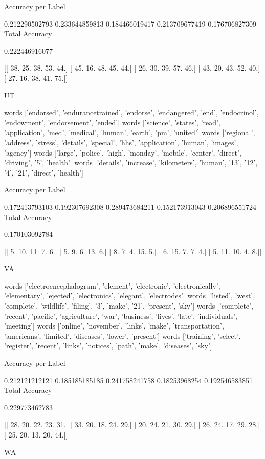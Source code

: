 \documentclass[11pt]{article}
\begin{document}
\begin{verbatium}
Accuracy per Label

0.212290502793
0.233644859813
0.184466019417
0.213709677419
0.176706827309
Total Accuracy

0.222446916077


[[ 38.  25.  38.  53.  44.]
 [ 45.  16.  48.  45.  44.]
 [ 26.  30.  39.  57.  46.]
 [ 43.  20.  43.  52.  40.]
 [ 27.  16.  38.  41.  75.]]


UT


words
['endorsed', 'endurancetrained', 'endorse', 'endangered', 'end', 'endocrinol', 'endowment', 'endorsement', 'ended']
words
['science', 'states', 'read', 'application', 'med', 'medical', 'human', 'earth', 'pm', 'united']
words
['regional', 'address', 'stress', 'details', 'special', 'hhs', 'application', 'human', 'images', 'agency']
words
['large', 'police', 'high', 'monday', 'mobile', 'center', 'direct', 'driving', '5', 'health']
words
['details', 'increase', 'kilometers', 'human', '13', '12', '4', '21', 'direct', 'health']

Accuracy per Label

0.172413793103
0.192307692308
0.289473684211
0.152173913043
0.206896551724
Total Accuracy

0.170103092784


[[  5.  10.  11.   7.   6.]
 [  5.   9.   6.  13.   6.]
 [  8.   7.   4.  15.   5.]
 [  6.  15.   7.   7.   4.]
 [  5.  11.  10.   4.   8.]]


VA


words
['electroencephalogram', 'element', 'electronic', 'electronically', 'elementary', 'ejected', 'electronics', 'elegant', 'electrodes']
words
['listed', 'west', 'complete', 'wildlife', 'filing', '3', 'make', '21', 'present', 'sky']
words
['complete', 'recent', 'pacific', 'agriculture', 'war', 'business', 'lives', 'late', 'individuals', 'meeting']
words
['online', 'november', 'links', 'make', 'transportation', 'americans', 'limited', 'diseases', 'lower', 'present']
words
['training', 'select', 'register', 'recent', 'links', 'notices', 'path', 'make', 'diseases', 'sky']

Accuracy per Label

0.212121212121
0.185185185185
0.241758241758
0.18253968254
0.192546583851
Total Accuracy

0.229773462783


[[ 28.  20.  22.  23.  31.]
 [ 33.  20.  18.  24.  29.]
 [ 20.  24.  21.  30.  29.]
 [ 26.  24.  17.  29.  28.]
 [ 25.  20.  13.  20.  44.]]


WA



\end{verbatium}
\end{document}
